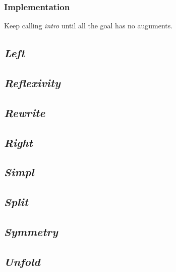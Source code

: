 \subsubsection*{Implementation}
Keep calling {\it intro} until all the goal has no auguments.

\subsection{\it Left}

\subsection{\it Reflexivity}

\subsection{\it Rewrite}

\subsection{\it Right}

\subsection{\it Simpl}

\subsection{\it Split}

\subsection{\it Symmetry}

\subsection{\it Unfold}

